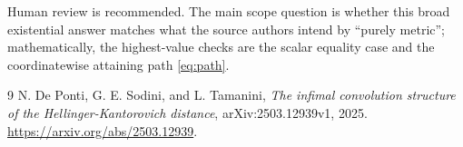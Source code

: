 \documentclass[11pt]{article}
\begin{document}
Human review is recommended.  The main scope question is whether this broad
existential answer matches what the source authors intend by ``purely metric'';
mathematically, the highest-value checks are the scalar equality case and the
coordinatewise attaining path \eqref{eq:path}.

\begin{thebibliography}{9}
N. De Ponti, G. E. Sodini, and L. Tamanini,
\emph{The infimal convolution structure of the Hellinger-Kantorovich
distance}, arXiv:2503.12939v1, 2025.
\url{https://arxiv.org/abs/2503.12939}.
\end{thebibliography}
\end{document}
